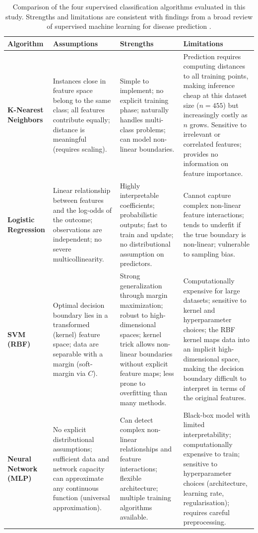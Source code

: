 \documentclass[twocolumn, fontsize=10pt]{article}
\begin{document}
\begin{table}[t]
\centering
\small
\setlength{\tabcolsep}{5pt}
\renewcommand{\arraystretch}{1.25}
\begin{tabularx}{\textwidth}{p{}XXX}
\toprule
\textbf{Algorithm} & \textbf{Assumptions} & \textbf{Strengths} & \textbf{Limitations} \\
\midrule
\textbf{K-Nearest Neighbors}
  & Instances close in feature space belong to the same class; all features contribute equally; distance is meaningful (requires scaling).
  & Simple to implement; no explicit training phase; naturally handles multi-class problems; can model non-linear boundaries.
  & Prediction requires computing distances to all training points, making inference cheap at this dataset size ($n=455$) but increasingly costly as $n$ grows. Sensitive to irrelevant or correlated features; provides no information on feature importance. \\
\addlinespace
\textbf{Logistic Regression}
  & Linear relationship between features and the log-odds of the outcome; observations are independent; no severe multicollinearity.
  & Highly interpretable coefficients; probabilistic outputs; fast to train and update; no distributional assumption on predictors.
  & Cannot capture complex non-linear feature interactions; tends to underfit if the true boundary is non-linear; vulnerable to sampling bias. \\
\addlinespace
\textbf{SVM (RBF)}
  & Optimal decision boundary lies in a transformed (kernel) feature space; data are separable with a margin (soft-margin via $C$).
  & Strong generalization through margin maximization; robust to high-dimensional spaces; kernel trick allows non-linear boundaries without explicit feature maps; less prone to overfitting than many methods.
  & Computationally expensive for large datasets; sensitive to kernel and hyperparameter choices; the RBF kernel maps data into an implicit high-dimensional space, making the decision boundary difficult to interpret in terms of the original features. \\
\addlinespace
\textbf{Neural Network (MLP)}
  & No explicit distributional assumptions; sufficient data and network capacity can approximate any continuous function (universal approximation).
  & Can detect complex non-linear relationships and feature interactions; flexible architecture; multiple training algorithms available.
  & Black-box model with limited interpretability; computationally expensive to train; sensitive to hyperparameter choices (architecture, learning rate, regularisation); requires careful preprocessing.\\
\bottomrule
\end{tabularx}
\caption{Comparison of the four supervised classification algorithms evaluated in this study. Strengths and limitations are consistent with findings from a broad review of supervised machine learning for disease prediction \citep{uddin2019comparing}.}
\label{tab:model_comparison}
\end{table}
\end{document}

